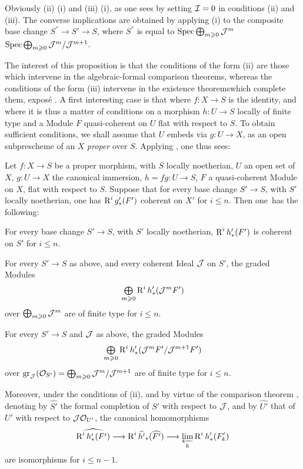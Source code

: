 Obviously (ii) \ALORS (i) and (iii) \ALORS (i), as one sees by setting ${\mathcal I}=0$ in conditions (ii) and (iii). The converse implications are obtained by applying (i) to the composite base change $S^{''}\to S'\to S$, where $S^{''}$ is equal to $\operatorname{Spec} \bigoplus_{m\geqslant 0} {\mathcal J}^m$ \resp $\operatorname{Spec} \bigoplus_{m\geqslant 0} {\mathcal J}^m/{\mathcal J}^{m+1}$.

The interest of this proposition is that the conditions of the form (ii) are those which intervene in the \og algebraic-formal comparison theorems\fg, whereas the conditions of the form (iii) intervene in the \og existence theorems\fg which complete them, \cf expos\'e . A first interesting case is that where $f:X\to S$ is the identity, and where it is thus a matter of conditions on a morphism $h:U\to S$ locally of finite type and a Module $F$ quasi-coherent on $U$ flat with respect to $S$. To obtain sufficient conditions, we shall assume that $U$ embeds via $g:U\to X$, as an open subprescheme of an $X$ \emph{proper} over $S$. Applying , one thus sees:

\begin{corollary} \label{XII.5.8}
Let $f:X\to S$ be a proper morphism, with $S$ locally noetherian, $U$ an open set of $X$, $g:U\to X$ the canonical immersion, $h=fg:U\to S$, $F$ a quasi-coherent Module on $X$, flat with respect to $S$. Suppose that for every base change $S'\to S$, with $S'$ locally noetherian, one has $\operatorname{R}^ig'_\ast(F')$ coherent on $X'$ for $i\leq n$. Then one~has the following:
\begin{enumeratei}
\item
For every base change $S'\to S$, with $S'$ locally noetherian, $\operatorname{R}^ih'_\ast(F')$ is coherent on $S'$ for $i\leq n$.
\item
For every $S'\to S$ as above, and every coherent Ideal ${\mathcal J}$ on $S'$, the graded Modules
\[
\mathop{\textstyle\bigoplus}\limits_{m\geqslant 0} \operatorname{R}^ih'_\ast({\mathcal J}^mF')
\]
over $\bigoplus_{m\geqslant 0}{\mathcal J}^m$ are of finite type for $i\leq n$.
\item
For every $S'\to S$ and ${\mathcal J}$ as above, the graded Modules
\[
\mathop{\textstyle\bigoplus}\limits_{m\geqslant 0} \operatorname{R}^ih'_\ast({\mathcal J}^mF'/{\mathcal J}^{m+1}F')
\]
over $\operatorname{gr}_{\mathcal J}({\mathcal O}_{S'})=\bigoplus_{m\geqslant 0}{\mathcal J}^m/{\mathcal J}^{m+1}$ are of finite type for $i\leq n$.

Moreover, under the conditions of (ii), and by virtue of the comparison theorem , denoting by $\widehat{S'}$ the formal completion of $S'$ with respect to ${\mathcal J}$, and by $\widehat{U'}$ that of $U'$ with respect to ${\mathcal J}{\mathcal O}_{U'}$, the canonical homomorphisms
\[
\widehat{\R^ih'_\ast(F')} \to \R^i\widehat{h'}_\ast(\widehat{F'}) \to \varprojlim_k\R^ih'_\ast(F'_k)
\]
are isomorphisms for $i\leq n-1$.
\end{enumeratei}
\end{corollary}

